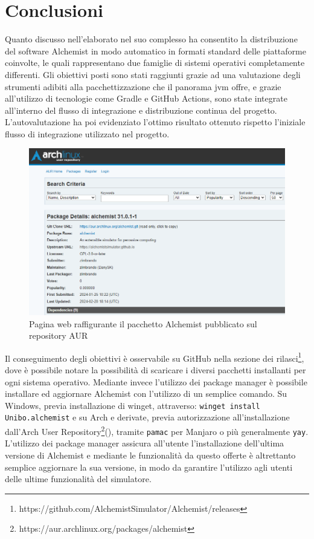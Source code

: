 
\chapter{Conclusioni}
Quanto discusso nell'elaborato nel suo complesso ha consentito la distribuzione del software Alchemist in modo automatico in formati standard delle piattaforme coinvolte, le quali rappresentano due famiglie di sistemi operativi completamente differenti. Gli obiettivi posti sono stati raggiunti grazie ad una valutazione degli strumenti adibiti alla pacchettizzazione che il panorama \ac{jvm} offre, e grazie all'utilizzo di tecnologie come Gradle e GitHub Actions, sono state integrate all'interno del flusso di integrazione e distribuzione continua del progetto. L'autovalutazione ha poi evidenziato l'ottimo risultato ottenuto rispetto l'iniziale flusso di integrazione utilizzato nel progetto.

\begin{figure}[htb]
	\centering
	\includegraphics[width=.8\linewidth]{figures/alchemist-aur.png}
	\caption{Pagina web raffigurante il pacchetto Alchemist pubblicato sul repository AUR}
	\label{fig:aur-web}
\end{figure}

Il conseguimento degli obiettivi è osservabile su GitHub nella sezione dei rilasci\footnote{https://github.com/AlchemistSimulator/Alchemist/releases}, dove è possibile notare la possibilità di scaricare i diversi pacchetti installanti per ogni sistema operativo. Mediante invece l'utilizzo dei package manager è possibile installare ed aggiornare Alchemist con l'utilizzo di un semplice comando. Su Windows, previa installazione di winget, attraverso:
\texttt{winget install Unibo.alchemist}
e su Arch e derivate, previa autorizzazione all'installazione dall'Arch User Repository\footnote{https://aur.archlinux.org/packages/alchemist}(), tramite \texttt{pamac} per Manjaro o più generalmente \texttt{yay}.
L'utilizzo dei package manager assicura all'utente l'installazione dell'ultima versione di Alchemist e mediante le funzionalità da questo offerte è altrettanto semplice aggiornare la sua versione, in modo da garantire l'utilizzo agli utenti delle ultime funzionalità del simulatore. 

